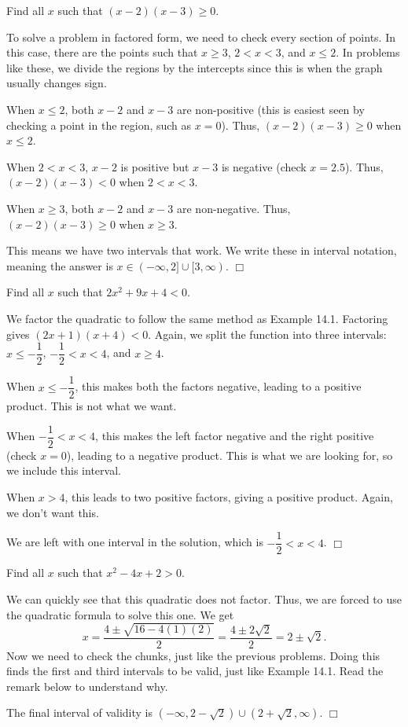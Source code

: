 \documentclass[lang=en,11pt]{elegantbook}
\begin{document}
\begin{example}
Find all $x$ such that $(x-2)(x-3)\geq 0$.
\end{example}
\begin{solution}
To solve a problem in factored form, we need to check every section of points.  In this case, there are the points such that $x\geq 3$, $2<x<3$, and $x\leq 2$.  In problems like these, we divide the regions by the intercepts since this is when the graph usually changes sign.

When $x\leq 2$, both $x-2$ and $x-3$ are non-positive (this is easiest seen by checking a point in the region, such as $x=0$).  Thus, $(x-2)(x-3)\geq 0$ when $x\leq 2$.  

When $2<x<3$, $x-2$ is positive but $x-3$ is negative (check $x=2.5$).  Thus, $(x-2)(x-3)<0$ when $2<x<3$.  

When $x\geq 3$, both $x-2$ and $x-3$ are non-negative.  Thus, $(x-2)(x-3)\geq 0$ when $x\geq 3$.  

This means we have two intervals that work.  We write these in interval notation, meaning the answer is $x\in(-\infty,2]\cup[3,\infty)$. $\Box$
\end{solution}
\begin{example}
Find all $x$ such that $2x^2+9x+4<0$.
\end{example}
\begin{solution}
We factor the quadratic to follow the same method as Example 14.1.  Factoring gives $(2x+1)(x+4)<0$.  Again, we split the function into three intervals: $x\leq-\dfrac{1}{2}$, $-\dfrac{1}{2}<x<4$, and $x\geq 4$.

When $x\leq -\dfrac{1}{2}$, this makes both the factors negative, leading to a positive product.  This is not what we want.

When $-\dfrac{1}{2}<x<4$, this makes the left factor negative and the right positive (check $x=0$), leading to a negative product.  This is what we are looking for, so we include this interval.

When $x>4$, this leads to two positive factors, giving a positive product.  Again, we don't want this.

We are left with one interval in the solution, which is $-\dfrac{1}{2}<x<4$. $\Box$
\end{solution}
\begin{example}
Find all $x$ such that $x^2-4x+2>0$.
\end{example}
\begin{solution}
We can quickly see that this quadratic does not factor.  Thus, we are forced to use the quadratic formula to solve this one.  We get $$x=\dfrac{4\pm\sqrt{16-4(1)(2)}}{2}=\dfrac{4\pm 2\sqrt{2}}{2}=2\pm\sqrt{2}.$$ Now we need to check the chunks, just like the previous problems.  Doing this finds the first and third intervals to be valid, just like Example 14.1.  Read the remark below to understand why.

The final interval of validity is $(-\infty,2-\sqrt{2})\cup(2+\sqrt{2},\infty)$. $\Box$
\end{solution}
\end{document}
